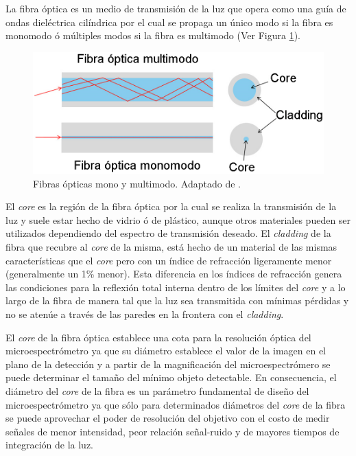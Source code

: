 La fibra óptica es un medio de transmisión de la luz que opera como una guía de ondas dieléctrica cilíndrica por el cual se propaga un único modo si la fibra es monomodo ó múltiples modos si la fibra es multimodo (Ver Figura \ref{fig:guiasmon}). 
\begin{figure}[H]
	\centering
	\includegraphics[width=1.0\textwidth]{Figs/introduccion/guias.png}
	\caption{Fibras ópticas mono y multimodo. Adaptado de \cite{dintek}.}
	\label{fig:guiasmon}
\end{figure}
El \textit{core} es la región de la fibra óptica por la cual se realiza la transmisión de la luz y suele estar hecho de vidrio ó de plástico, aunque otros materiales pueden ser utilizados dependiendo del espectro de transmisión deseado. El \textit{cladding} de la fibra que recubre al \textit{core} de la misma, está hecho de un material de las mismas características que el \textit{core} pero con un índice de refracción ligeramente menor (generalmente un 1\% menor)\cite{hecht2012optics}. Esta diferencia en los índices de refracción genera las condiciones para la reflexión total interna dentro de los límites del \textit{core} y a lo largo de la fibra de manera tal que la luz sea transmitida con mínimas pérdidas y no se atenúe a través de las paredes en la frontera con el \textit{cladding}. 

El \textit{core} de la fibra óptica establece una cota para la resolución óptica del microespectrómetro ya que su diámetro establece el valor de la imagen en el plano de la detección y a partir de la magnificación del microespectrómero se puede determinar el tamaño del mínimo objeto detectable. En consecuencia, el diámetro del \textit{core} de la fibra es un parámetro fundamental de diseño del microespectrómetro ya que sólo para determinados diámetros del \textit{core} de la fibra se puede aprovechar el poder de resolución del objetivo con el costo de medir señales de menor intensidad, peor relación señal-ruido y de mayores tiempos de integración de la luz.


